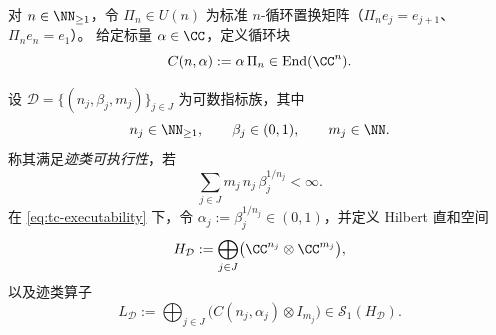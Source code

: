 \begin{definition}[循环块]\label{def:cyclic-block}
对 \(n\in\NN_{\ge 1}\)，令 \(\Pi_n\in U(n)\) 为标准 \(n\)-循环置换矩阵（\(\Pi_n e_j=e_{j+1}\)、\(\Pi_n e_n=e_1\)）。
给定标量 \(\alpha\in\CC\)，定义循环块
\[
C(n,\alpha):=\alpha\,\Pi_n\in \mathrm{End}(\CC^n).
\]
\end{definition}

\begin{definition}\label{def:traceclass-primitive-data}
设 \(\mathcal D=\{(n_j,\beta_j,m_j)\}_{j\in J}\) 为可数指标族，其中
\[
n_j\in\NN_{\ge 1},\qquad \beta_j\in(0,1),\qquad m_j\in\NN.
\]
称其满足\emph{迹类可执行性}，若
\begin{equation}\label{eq:tc-executability}
\sum_{j\in J} m_j\,n_j\,\beta_j^{1/n_j}<\infty.
\end{equation}
在 \eqref{eq:tc-executability} 下，令 \(\alpha_j:=\beta_j^{1/n_j}\in(0,1)\)，并定义 Hilbert 直和空间
\[
H_{\mathcal D}:=\bigoplus_{j\in J}\bigl(\CC^{n_j}\otimes \CC^{m_j}\bigr),
\]
以及迹类算子
\[
L_{\mathcal D}:=\bigoplus_{j\in J}\bigl(C(n_j,\alpha_j)\otimes I_{m_j}\bigr)\in\mathcal{S}_1(H_{\mathcal D}).
\]
\end{definition}

